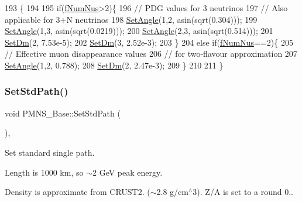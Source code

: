 \begin{DoxyCode}
193 \{
194 
195   \textcolor{keywordflow}{if}(\hyperlink{classOscProb_1_1PMNS__Base_a24bb74bed63569dfe88b18fa6a08060e}{fNumNus}>2)\{
196     \textcolor{comment}{// PDG values for 3 neutrinos}
197     \textcolor{comment}{// Also applicable for 3+N neutrinos}
198     \hyperlink{classOscProb_1_1PMNS__Base_ace7875cf6d3bec161a2b7ed2690aec34}{SetAngle}(1,2, asin(sqrt(0.304)));
199     \hyperlink{classOscProb_1_1PMNS__Base_ace7875cf6d3bec161a2b7ed2690aec34}{SetAngle}(1,3, asin(sqrt(0.0219)));
200     \hyperlink{classOscProb_1_1PMNS__Base_ace7875cf6d3bec161a2b7ed2690aec34}{SetAngle}(2,3, asin(sqrt(0.514)));
201     \hyperlink{classOscProb_1_1PMNS__Base_a492243b22fb1b783cd2943f507cff970}{SetDm}(2, 7.53e-5);
202     \hyperlink{classOscProb_1_1PMNS__Base_a492243b22fb1b783cd2943f507cff970}{SetDm}(3, 2.52e-3);
203   \}
204   \textcolor{keywordflow}{else} \textcolor{keywordflow}{if}(\hyperlink{classOscProb_1_1PMNS__Base_a24bb74bed63569dfe88b18fa6a08060e}{fNumNus}==2)\{
205     \textcolor{comment}{// Effective muon disappearance values}
206     \textcolor{comment}{// for two-flavour approximation}
207     \hyperlink{classOscProb_1_1PMNS__Base_ace7875cf6d3bec161a2b7ed2690aec34}{SetAngle}(1,2, 0.788);
208     \hyperlink{classOscProb_1_1PMNS__Base_a492243b22fb1b783cd2943f507cff970}{SetDm}(2, 2.47e-3);
209   \}
210 
211 \}
\end{DoxyCode}
\mbox{\label{classOscProb_1_1PMNS__Base_add6533a9fc9acdfc7ae258b62570d78d}} 
\subsubsection{\texorpdfstring{Set\+Std\+Path()}{SetStdPath()}}
{\footnotesize\ttfamily void P\+M\+N\+S\+\_\+\+Base\+::\+Set\+Std\+Path (\begin{DoxyParamCaption}{ }\end{DoxyParamCaption})\hspace{0.3cm}{\ttfamily [virtual]}, {\ttfamily [inherited]}}

Set standard single path.

Length is 1000 km, so $\sim$2 GeV peak energy.

Density is approximate from C\+R\+U\+S\+T2. ($\sim$2.8 g/cm$^\wedge$3). Z/A is set to a round 0.. 


